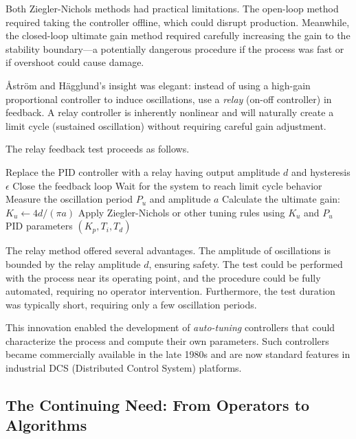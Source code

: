 Both Ziegler-Nichols methods had practical limitations. The open-loop method required taking the controller offline, which could disrupt production. Meanwhile, the closed-loop ultimate gain method required carefully increasing the gain to the stability boundary---a potentially dangerous procedure if the process was fast or if overshoot could cause damage.

\AA{}str\"om and H\"agglund's insight was elegant: instead of using a high-gain proportional controller to induce oscillations, use a \textit{relay} (on-off controller) in feedback. A relay controller is inherently nonlinear and will naturally create a limit cycle (sustained oscillation) without requiring careful gain adjustment.

The relay feedback test proceeds as follows.

\begin{algorithm}
\caption{Relay Feedback Auto-Tuning Procedure}
\begin{algorithmic}[1]
\State Replace the PID controller with a relay having output amplitude $d$ and hysteresis $\epsilon$
\State Close the feedback loop
    \State Wait for the system to reach limit cycle behavior
\EndWhile
\State Measure the oscillation period $P_u$ and amplitude $a$
\State Calculate the ultimate gain: $K_u \gets 4d/(\pi a)$
\State Apply Ziegler-Nichols or other tuning rules using $K_u$ and $P_u$
\State \Return PID parameters $(K_p, T_i, T_d)$
\end{algorithmic}
\end{algorithm}

The relay method offered several advantages. The amplitude of oscillations is bounded by the relay amplitude $d$, ensuring safety. The test could be performed with the process near its operating point, and the procedure could be fully automated, requiring no operator intervention. Furthermore, the test duration was typically short, requiring only a few oscillation periods.

This innovation enabled the development of \textit{auto-tuning} controllers that could characterize the process and compute their own parameters. Such controllers became commercially available in the late 1980s and are now standard features in industrial DCS (Distributed Control System) platforms.

\subsection{The Continuing Need: From Operators to Algorithms}

